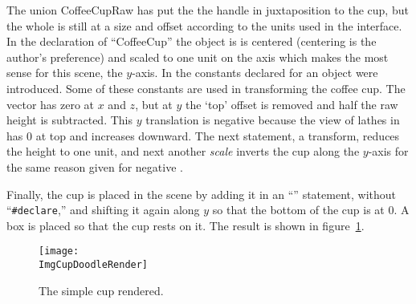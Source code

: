 		The union CoffeeCupRaw has put the the handle in juxtaposition
		to the cup, but the whole is still at a size and offset
		according to the units used in the \IXpkg{} interface.
		In the declaration of ``CoffeeCup'' the object is
		is centered (centering is the author's preference) and
		scaled to one unit on the axis which makes the most sense
		for this scene, the $y$-axis. In
		the constants declared for an object were introduced.
		Some of these constants are used in transforming
		the coffee cup. The \emph{}
		vector has zero at $x$ and $z$, but at $y$ the
		`top' offset is removed and half the raw height
		is subtracted. This $y$ translation is negative
		because the view of lathes in \IXpkg{} has $0$
		at top and increases downward. The next statement,
		a \emph{} transform, reduces the height
		to one unit, and next another \emph{scale}
		inverts the cup along the $y$-axis for the same
		reason given for negative .
		
		Finally, the cup is placed in the scene by adding
		it in an ``'' statement,
		without ``\verb!#declare!,'' and shifting it again
		along $y$ so that the bottom of the cup
		is at $0$.
		A box is placed so that the cup rests on it.
		The result is shown in
		figure~\ref{fig:cup_doodle_render}.

		\begin{figure}[htbp]
		\centering
		\texttt{[image: \\ImgCupDoodleRender]}
		\caption{The simple cup rendered.}
		\label{fig:cup_doodle_render}
		\end{figure}

